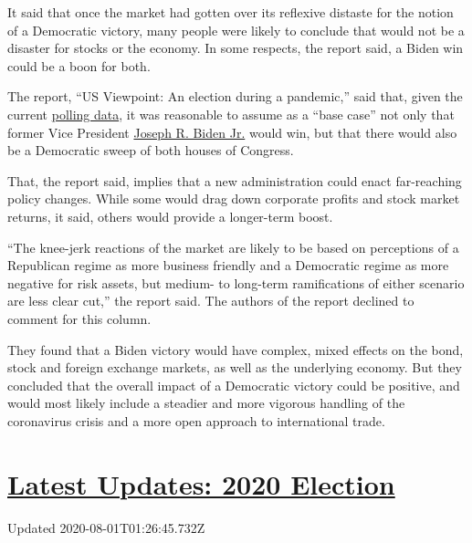 It said that once the market had gotten over its reflexive distaste for
the notion of a Democratic victory, many people were likely to conclude
that would not be a disaster for stocks or the economy. In some
respects, the report said, a Biden win could be a boon for both.

The report, ``US Viewpoint: An election during a pandemic,'' said that,
given the current
\href{https://www.realclearpolitics.com/epolls/latest_polls/}{polling
data}, it was reasonable to assume as a ``base case'' not only that
former Vice President
\href{https://www.nytimes.com/interactive/2020/us/elections/joe-biden.html}{Joseph
R. Biden Jr.} would win, but that there would also be a Democratic sweep
of both houses of Congress.

That, the report said, implies that a new administration could enact
far-reaching policy changes. While some would drag down corporate
profits and stock market returns, it said, others would provide a
longer-term boost.

``The knee-jerk reactions of the market are likely to be based on
perceptions of a Republican regime as more business friendly and a
Democratic regime as more negative for risk assets, but medium- to
long-term ramifications of either scenario are less clear cut,'' the
report said. The authors of the report declined to comment for this
column.

They found that a Biden victory would have complex, mixed effects on the
bond, stock and foreign exchange markets, as well as the underlying
economy. But they concluded that the overall impact of a Democratic
victory could be positive, and would most likely include a steadier and
more vigorous handling of the coronavirus crisis and a more open
approach to international trade.

\hypertarget{latest-updates-2020-election}{%
\section{\texorpdfstring{\href{https://www.nytimes.com/2020/07/31/us/elections/biden-vs-trump.html?action=click\&pgtype=Article\&state=default\&region=MAIN_CONTENT_1\&context=storylines_live_updates}{Latest
Updates: 2020
Election}}{Latest Updates: 2020 Election}}\label{latest-updates-2020-election}}

Updated 2020-08-01T01:26:45.732Z


